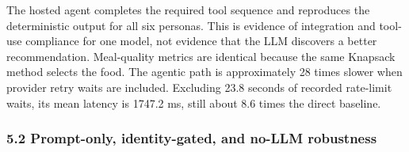 \documentclass[
  10pt,
  letterpaper,
]{article}
\begin{document}
The hosted agent completes the required tool sequence and reproduces the
deterministic output for all six personas. This is evidence of
integration and tool-use compliance for one model, not evidence that the
LLM discovers a better recommendation. Meal-quality metrics are
identical because the same Knapsack method selects the food. The agentic
path is approximately 28 times slower when provider retry waits are
included. Excluding 23.8 seconds of recorded rate-limit waits, its mean
latency is 1747.2 ms, still about 8.6 times the direct baseline.

\subsubsection{5.2 Prompt-only, identity-gated, and no-LLM
robustness}\label{prompt-only-identity-gated-and-no-llm-robustness}
\end{document}

